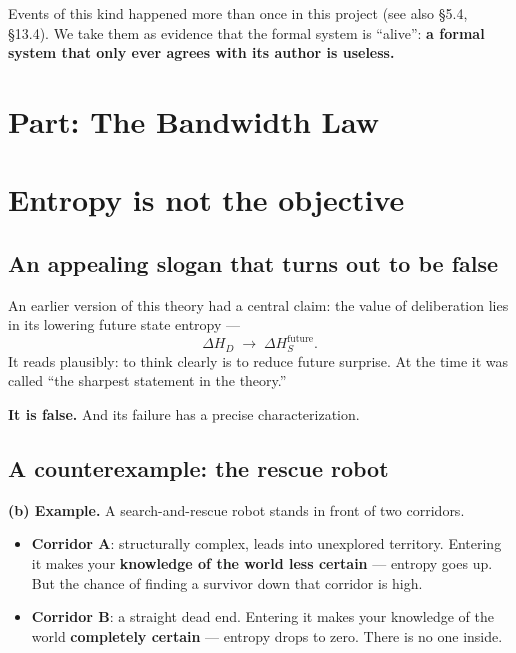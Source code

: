 \documentclass[11pt]{article}
\providecommand{\tightlist}{%
  \setlength{\itemsep}{0pt}\setlength{\parskip}{0pt}}
\begin{document}
Events of this kind happened more than once in this project (see also \S{}5.4, \S{}13.4). We take them as evidence that the formal system is ``alive'': \textbf{a formal system that only ever agrees with its author is useless.}

\hypertarget{part-the-bandwidth-law}{%
\section*{Part: The Bandwidth Law}\label{part-the-bandwidth-law}}

\hypertarget{entropy-is-not-the-objective}{%
\section{Entropy is not the objective}\label{entropy-is-not-the-objective}}

\hypertarget{an-appealing-slogan-that-turns-out-to-be-false}{%
\subsection{An appealing slogan that turns out to be false}\label{an-appealing-slogan-that-turns-out-to-be-false}}

An earlier version of this theory had a central claim: the value of deliberation lies in its lowering future state entropy ---
\[\Delta H_D\;\longrightarrow\;\Delta H_S^{\text{future}}.\]
It reads plausibly: to think clearly is to reduce future surprise. At the time it was called ``the sharpest statement in the theory.''

\textbf{It is false.} And its failure has a precise characterization.

\hypertarget{a-counterexample-the-rescue-robot}{%
\subsection{A counterexample: the rescue robot}\label{a-counterexample-the-rescue-robot}}

\textbf{(b) Example.} A search-and-rescue robot stands in front of two corridors.

\begin{itemize}
\tightlist
\item
  \textbf{Corridor A}: structurally complex, leads into unexplored territory. Entering it makes your \textbf{knowledge of the world less certain} --- entropy goes up. But the chance of finding a survivor down that corridor is high.
\item
  \textbf{Corridor B}: a straight dead end. Entering it makes your knowledge of the world \textbf{completely certain} --- entropy drops to zero. There is no one inside.
\end{itemize}
\end{document}
